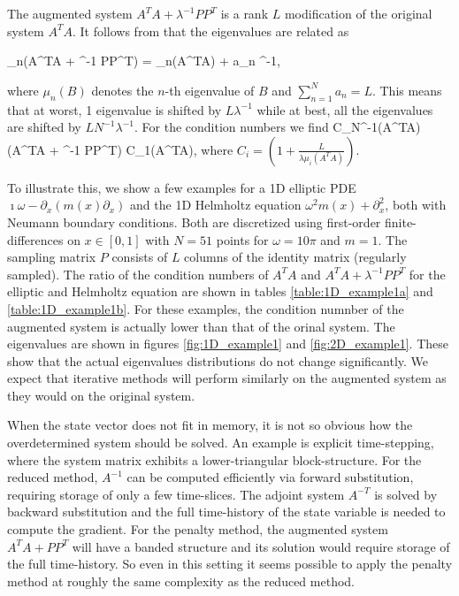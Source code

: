 \documentclass{iopart}
\begin{document}
The augmented system $A^TA + \lambda^{-1} PP^T$ is a rank $L$ modification of the 
original system $A^TA$. It follows from \cite[Thm 8.1.8]{Golub1996} that the eigenvalues are related as

\bq
\mu_n(A^TA + \lambda^{-1} PP^T) = \mu_n(A^TA) + a_n \lambda^{-1},
\eq

where $\mu_n(B)$ denotes the $n$-th eigenvalue of $B$ and $\sum_{n=1}^{N} a_n = L$. 
This means that at worst, 1 eigenvalue is shifted by $L\lambda^{-1}$ while at best, all the eigenvalues are 
shifted by $LN^{-1}\lambda^{-1}$. For the condition numbers we find
\bq
C_N^{-1}\kappa(A^TA)\leq \kappa(A^TA + \lambda^{-1} PP^T) \leq C_1\kappa(A^TA),
\eq
where $C_i = \left(1 + \frac{L}{\lambda \mu_i(A^TA)}\right)$.

To illustrate this, we show a few examples for a 1D elliptic PDE $\imath\omega - \partial_x\left(m(x)\partial_x\right)$
and the 1D Helmholtz equation $\omega^2m(x) + \partial_x^2$, both with Neumann boundary conditions. Both are discretized using
first-order finite-differences on $x \in [0,1]$ with $N=51$ points for $\omega = 10\pi$ and $m=1$.
The sampling matrix $P$ consists of $L$ columns of the identity matrix (regularly sampled).
The ratio of the condition numbers of $A^TA$ and $A^TA + \lambda^{-1}PP^T$ for the elliptic and Helmholtz equation are shown in tables \ref{table:1D_example1a} and 
\ref{table:1D_example1b}. For these examples, the condition numnber of the augmented system is actually lower than that of the orinal system. The eigenvalues 
are shown in figures \ref{fig:1D_example1} and \ref{fig:2D_example1}. These show that the actual eigenvalues distributions do not change significantly. We expect
that iterative methods will perform similarly on the augmented system as they would on the original system.

When the state vector does not fit in memory, it is not so obvious how the overdetermined system should
be solved. An example is explicit time-stepping, where the system matrix exhibits a lower-triangular block-structure.
For the reduced method, $A^{-1}$ can be computed efficiently via forward substitution, requiring storage of only a few time-slices. 
The adjoint system $A^{-T}$ is solved by backward substitution and the full time-history of the state variable is needed to 
compute the gradient.
For the penalty method, the augmented system $A^TA + PP^T$ will have a banded structure and its solution would require storage of the full time-history.
So even in this setting it seems possible to apply the penalty method at roughly the same complexity as the reduced method.
\end{document}
